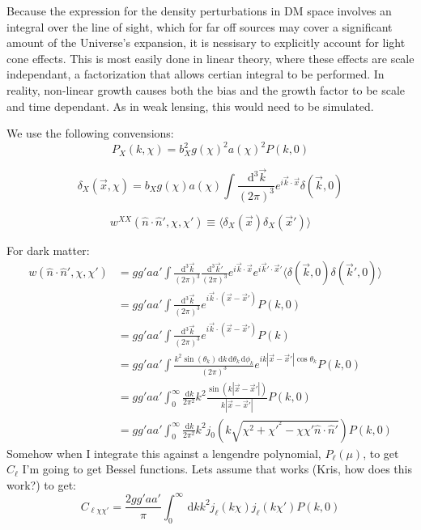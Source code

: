 \documentclass[onecolumn,prd,nofootinbib]{revtex4-1}
\newcommand{\ud}{\,\mathrm{d}}
\begin{document}
Because the expression for the density perturbations in DM space involves an
integral over the line of sight, which for far off sources may cover a
significant amount of the Universe's expansion, it is nessisary to explicitly
account for light cone effects. This is most easily done in linear theory,
where these effects are scale independant, a factorization that allows certian
integral to be performed. In reality, non-linear growth causes both the bias
and the growth factor to be scale and time dependant. As in weak lensing, this
would need to be simulated.

We use the following convensions:
\begin{equation}
    P_X(k, \chi) = b_X^2 g(\chi)^2 a(\chi)^2 P(k, 0)
\end{equation}

\begin{equation}
    \delta_X(\vec x, \chi) =  b_X g(\chi) a(\chi) \int\frac{\ud^3\vec k}{(2 \pi)^3}
        e^{i\vec k \cdot \vec x} \delta(\vec k, 0)
\end{equation}

\begin{equation}
    w^{XX}(\hat n \cdot \hat n', \chi, \chi')
    \equiv \langle \delta_X(\vec x) \delta_X(\vec x') \rangle
\end{equation}

For dark matter:
\begin{align}
w(\hat n \cdot \hat n', \chi, \chi') 
    &= gg'aa'
        \int\frac{\ud^3\vec k}{(2 \pi)^3} \frac{\ud^3\vec k'}{(2 \pi)^3}
        e^{i\vec k \cdot \vec x} e^{i\vec k' \cdot \vec x'}
        \langle \delta(\vec k, 0) \delta(\vec k', 0) \rangle\\
    &= gg'aa'
        \int\frac{\ud^3\vec k}{(2 \pi)^3} 
        e^{i\vec k \cdot (\vec x - \vec x')} P(k, 0)\\
    &= gg'aa'
        \int\frac{\ud^3\vec k}{(2 \pi)^3} 
        e^{i\vec k \cdot (\vec x - \vec x')} P(k)\\
    &= gg'aa'
        \int\frac{k^2 \sin(\theta_k) \ud k \ud \theta_k \ud \phi_k}{(2 \pi)^3} 
        e^{i k |\vec x - \vec x'| \cos\theta_k} P(k, 0)\\
    &= gg'aa'
        \int_0^\infty\frac{\ud k}{2 \pi^2} k^2
        \frac{\sin(k |\vec x - \vec x'|)}{k |\vec x - \vec x'|} P(k, 0)\\
    &= gg'aa'
        \int_0^\infty\frac{\ud k}{2 \pi^2} k^2
        j_0 (k \sqrt{\chi^2 + \chi'^{^2} - \chi \chi' \hat n \cdot \hat n'})
        P(k, 0)
\end{align}
Somehow when I integrate this against a lengendre polynomial, $P_\ell(\mu)$,
to get $C_\ell$
I'm going to get Bessel functions. Lets assume that works (Kris, how does this
work?) to get:
\begin{equation}
    C_{\ell\chi\chi'} = \frac{2 gg'aa'}{\pi}
    \int_0^\infty\ud k k^2 j_\ell(k \chi) j_\ell(k \chi')
        P(k, 0)
\end{equation}
\end{document}
